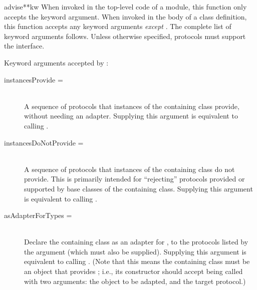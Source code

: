 \begin{verbatim%
}
\begin{verbatim%
}
\begin{verbatim%
}
\begin{verbatim%
}
\begin{verbatim%
}
\begin{verbatim%
}
\begin{funcdesc}{advise}{**kw}
When invoked in the top-level code of a module, this function only accepts
the  keyword argument.  When invoked in the body of a
class definition, this function accepts any keyword arguments \emph{except}
.  The complete list of keyword arguments follows.
Unless otherwise specified, protocols must support the 
interface.

\end{funcdesc}













Keyword arguments accepted by :

\begin{description}

\item[instancesProvide = ] \hfill \\
A sequence of protocols that instances of the containing class provide, without
needing an adapter.  Supplying this argument is equivalent to calling
.

\item[instancesDoNotProvide = ] \hfill \\
A sequence of protocols that instances of the containing class do not provide.
This is primarily intended for ``rejecting'' protocols provided or supported
by base classes of the containing class.  Supplying this argument is equivalent
to calling .

\item[asAdapterForTypes = ] \hfill \\
Declare the containing class as an adapter for , to the protocols
listed by the  argument (which must also be supplied).
Supplying this argument is equivalent to calling
.  (Note that this means the containing class must be an
object that provides ; i.e., its constructor should
accept being called with two arguments: the object to be adapted, and the
target protocol.)


\end{description}
\end{verbatim%
}
\end{verbatim%
}
\end{verbatim%
}
\end{verbatim%
}
\end{verbatim%
}
\end{verbatim%
}
